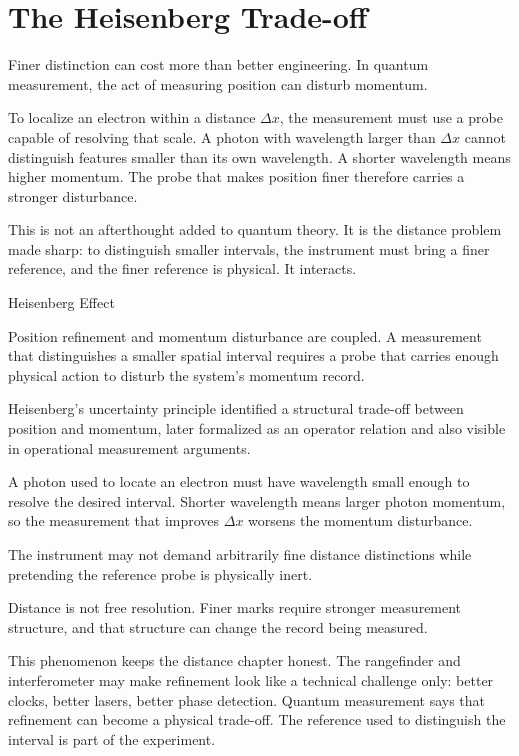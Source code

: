 \section{The Heisenberg Trade-off}
\label{se:the-heisenberg-trade-off}

Finer distinction can cost more than better engineering. In quantum measurement,
the act of measuring position can disturb momentum.

To localize an electron within a distance $\Delta x$, the measurement must use
a probe capable of resolving that scale. A photon with wavelength larger than
$\Delta x$ cannot distinguish features smaller than its own wavelength. A
shorter wavelength means higher momentum. The probe that makes position finer
therefore carries a stronger disturbance.

This is not an afterthought added to quantum theory. It is the distance problem
made sharp: to distinguish smaller intervals, the instrument must bring a finer
reference, and the finer reference is physical. It interacts.

\begin{phenom}{Heisenberg Effect}
\label{ph:heisenberg-effect}

\PhStatement Position refinement and momentum disturbance are coupled. A
measurement that distinguishes a smaller spatial interval requires a probe that
carries enough physical action to disturb the system's momentum record.

\PhOrigin Heisenberg's uncertainty principle identified a structural trade-off
between position and momentum, later formalized as an operator relation and
also visible in operational measurement arguments.

\PhObservation A photon used to locate an electron must have wavelength small
enough to resolve the desired interval. Shorter wavelength means larger photon
momentum, so the measurement that improves $\Delta x$ worsens the momentum
disturbance.

\PhConstraint The instrument may not demand arbitrarily fine distance
distinctions while pretending the reference probe is physically inert.

\PhConsequence Distance is not free resolution. Finer marks require stronger
measurement structure, and that structure can change the record being measured.

\end{phenom}

This phenomenon keeps the distance chapter honest. The rangefinder and
interferometer may make refinement look like a technical challenge only: better
clocks, better lasers, better phase detection. Quantum measurement says that
refinement can become a physical trade-off. The reference used to distinguish
the interval is part of the experiment.

